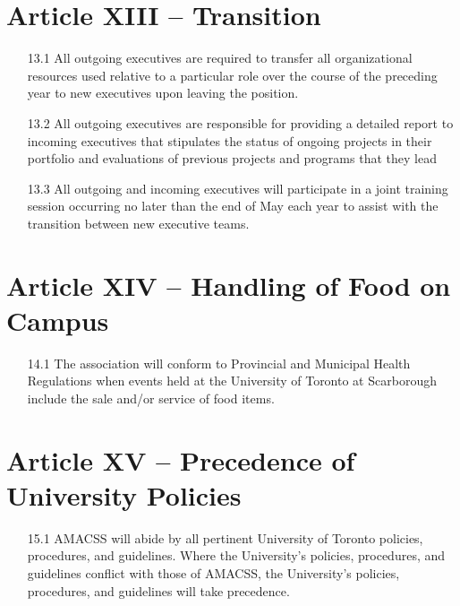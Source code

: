 \documentclass[12pt,a4paper]{article}
\begin{document}
\section*{Article XIII – Transition}

\begin{enumerate}
\item[13.1] All outgoing executives are required to transfer all organizational resources used relative to a particular role over the course of the preceding year to new executives upon leaving the position.

\item[13.2] All outgoing executives are responsible for providing a detailed report to incoming executives that stipulates the status of ongoing projects in their portfolio and evaluations of previous projects and programs that they lead

\item[13.3] All outgoing and incoming executives will participate in a joint training session occurring no later than the end of May each year to assist with the transition between new executive teams.
\end{enumerate}

\section*{Article XIV – Handling of Food on Campus}

\begin{enumerate}
\item[14.1] The association will conform to Provincial and Municipal Health Regulations when events held at the University of Toronto at Scarborough include the sale and/or service of food items.
\end{enumerate}

\section*{Article XV – Precedence of University Policies}

\begin{enumerate}
\item[15.1] AMACSS will abide by all pertinent University of Toronto policies, procedures, and guidelines. Where the University's policies, procedures, and guidelines conflict with those of AMACSS, the University's policies, procedures, and guidelines will take precedence.
\end{enumerate}
\end{document}
